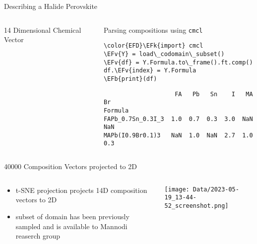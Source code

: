 \documentclass[10pt, aspectratio=169, presentation]{beamer}
\newcommand{\EFk}[1]{\textcolor{EFk}{#1}} %
\newcommand{\EFb}[1]{\textcolor{EFb}{#1}} %
\newcommand{\EFv}[1]{\textcolor{EFv}{#1}} %
\begin{document}
\begin{frame}[label={sec:orgfac5fd6},fragile]{Describing a Halide Perovskite}
 \begin{columns}
\begin{column}{0.4\columnwidth}
\begin{block}{14 Dimensional Chemical Vector}
 
\begin{center}

\end{center}
\end{block}
\end{column}

\begin{column}{0.6\columnwidth}
\begin{block}{Parsing compositions using \texttt{cmcl}}
\begin{Code}
\begin{Verbatim}
\color{EFD}\EFk{import} cmcl
\EFv{Y} = load\_codomain\_subset()
\EFv{df} = Y.Formula.to\_frame().ft.comp()
df.\EFv{index} = Y.Formula
\EFb{print}(df)
\end{Verbatim}
\end{Code}

\begin{small}
\begin{verbatim}
                    FA   Pb   Sn    I   MA   Br
Formula                                        
FAPb_0.7Sn_0.3I_3  1.0  0.7  0.3  3.0  NaN  NaN
MAPb(I0.9Br0.1)3   NaN  1.0  NaN  2.7  1.0  0.3
\end{verbatim}
\end{small}
\end{block}
\end{column}
\end{columns}
\end{frame}

\begin{frame}[label={sec:org9c27d2a}]{40000 Composition Vectors projected to 2D}
\begin{columns}
\begin{column}{0.4\columnwidth}
\begin{itemize}
\item t-SNE projection projects 14D composition vectors to 2D
\item subset of domain has been previously sampled and is available to
Mannodi reaserch group
\autocite{yang-2023-high-throug}
\end{itemize}
\end{column}

\begin{column}{0.6\columnwidth}
\begin{center}
\texttt{[image: Data/2023-05-19\_13-44-52\_screenshot.png]}
\end{center}
\end{column}
\end{columns}
\end{frame}
\end{document}
